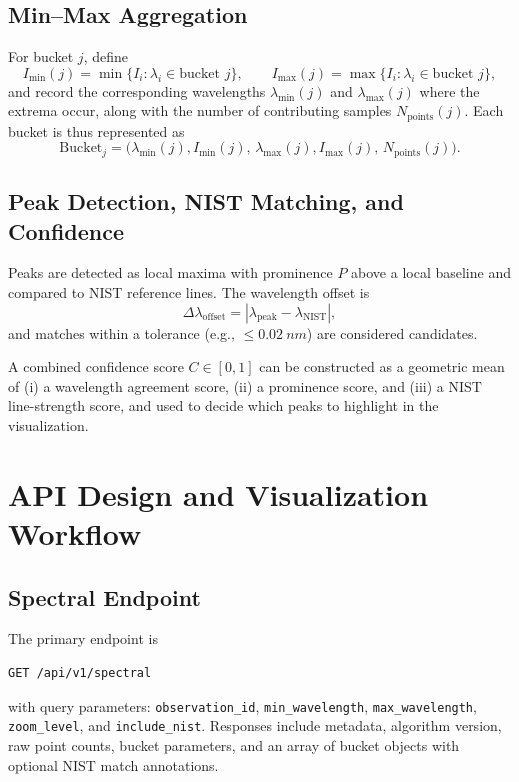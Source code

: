 \documentclass[12pt,a4paper]{article}
\begin{document}
\subsection{Min--Max Aggregation}

For bucket \(j\), define
\[
I_{\min}(j) = \min\{I_i : \lambda_i \in \text{bucket } j\}, \qquad
I_{\max}(j) = \max\{I_i : \lambda_i \in \text{bucket } j\},
\]
and record the corresponding wavelengths \(\lambda_{\min}(j)\) and \(\lambda_{\max}(j)\) where the extrema occur, along with the number of contributing samples \(N_{\text{points}}(j)\). Each bucket is thus represented as
\[
\text{Bucket}_j = \bigl(\lambda_{\min}(j), I_{\min}(j),\, \lambda_{\max}(j), I_{\max}(j),\, N_{\text{points}}(j)\bigr).
\]

\subsection{Peak Detection, NIST Matching, and Confidence}

Peaks are detected as local maxima with prominence \(P\) above a local baseline and compared to NIST reference lines. The wavelength offset is
\[
\Delta\lambda_{\text{offset}} = |\lambda_{\text{peak}} - \lambda_{\text{NIST}}|,
\]
and matches within a tolerance (e.g., \(\le \SI{0.02}{nm}\)) are considered candidates.

A combined confidence score \(C\in[0,1]\) can be constructed as a geometric mean of (i) a wavelength agreement score, (ii) a prominence score, and (iii) a NIST line-strength score, and used to decide which peaks to highlight in the visualization.

\section{API Design and Visualization Workflow}
\label{sec:api}

\subsection{Spectral Endpoint}

The primary endpoint is
\begin{verbatim}
GET /api/v1/spectral
\end{verbatim}
with query parameters: \texttt{observation\_id}, \texttt{min\_wavelength}, \texttt{max\_wavelength}, \texttt{zoom\_level}, and \texttt{include\_nist}. Responses include metadata, algorithm version, raw point counts, bucket parameters, and an array of bucket objects with optional NIST match annotations.
\end{document}
